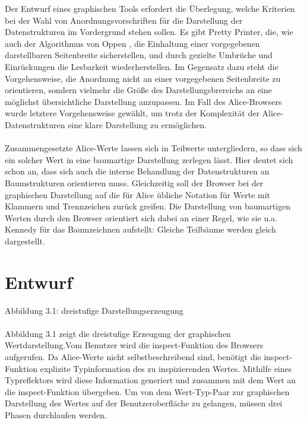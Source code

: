 \documentclass[12pt,a4paper]{article}
\begin{document}
Der Entwurf eines graphischen Tools erfordert die \"Uberlegung, 
welche Kriterien bei der Wahl von Anordnungsvorschriften f\"ur 
die Darstellung der Datenstrukturen im Vordergrund stehen sollen. 
Es gibt Pretty Printer, die, wie auch der 
Algorithmus von Oppen \cite{op:pr}, die Einhaltung einer vorgegebenen 
darstellbaren Seitenbreite sicherstellen, und durch gezielte 
Umbr\"uche und Einr\"uckungen die Lesbarkeit wiederherstellen. Im 
Gegensatz dazu steht die Vorgehensweise, die Anordnung nicht 
an einer vorgegebenen Seitenbreite zu orientieren, sondern 
vielmehr die Gr\"o\ss e des Darstellungsbrereichs an eine m\"oglichst 
\"ubersichtliche Darstellung anzupassen. 
Im Fall des Alice-Browsers wurde letztere Vorgehensweise gew\"ahlt, 
um trotz der Komplexit\"at der Alice-Datenstrukturen 
eine klare Darstellung zu erm\"oglichen.

\paragraph{}

Zusammengesetzte Alice-Werte lassen sich in Teilwerte untergliedern, 
so dass sich ein solcher Wert 
in eine baumartige Darstellung zerlegen l\"asst.
Hier deutet sich schon an, 
dass sich auch die interne Behandlung der Datenstrukturen 
an Baumstrukturen orientieren muss. Gleichzeitig soll der Browser 
bei der graphischen Darstellung auf 
die f\"ur Alice \"ubliche Notation f\"ur 
Werte mit Klammern und Trennzeichen 
zur\"uck greifen.    
Die Darstellung von baumartigen Werten durch 
den Browser orientiert sich dabei 
an einer Regel, wie sie u.a. Kennedy \cite{ke:dr} f\"ur 
das Baumzeichnen aufstellt: Gleiche Teilb\"aume werden 
gleich dargestellt. 



\section{Entwurf}

\begin{center}
Abbildung 3.1: dreistufige Darstellungserzeugung
\end{center}

\paragraph{}

Abbildung 3.1 zeigt die dreistufige Erzeugung der graphischen
Wertdarstellung.Vom Benutzer wird die inspect-Funktion des 
Browsers aufgerufen.
Da Alice-Werte nicht selbstbeschreibend sind, ben\"otigt die
inspect-Funktion explizite Typinformation des zu inspizierenden
Wertes. Mithilfe eines Typreflektors wird diese Information
generiert und zusammen mit dem Wert an die inspect-Funktion
\"ubergeben. Um von dem Wert-Typ-Paar zur graphischen 
Darstellung des Wertes auf der Benutzeroberfl\"ache zu gelangen,
m\"ussen drei Phasen durchlaufen werden.
\end{document}
